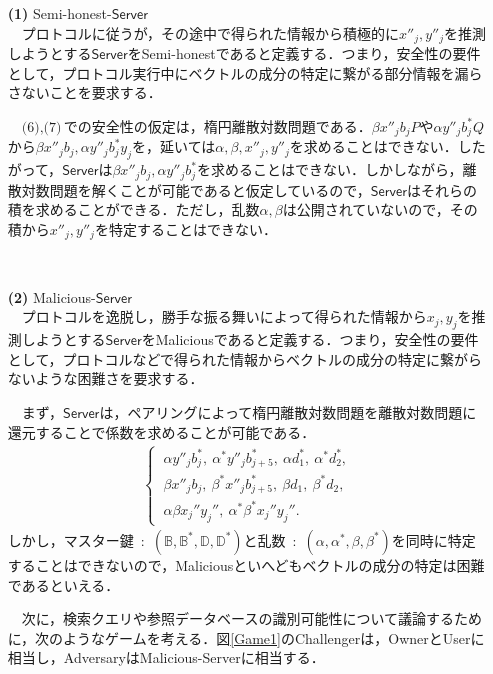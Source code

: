 \documentclass[a4paper]{jsarticle}
\newcommand{\user}{\textsf{User}}
\newcommand{\server}{\textsf{Server}}
\newcommand{\owner}{\textsf{Owner}}
\begin{document}
\begin{enumerate}
\item[\textbf{(1)}] Semi-honest-$\mathsf{Server}$\\
　プロトコルに従うが，その途中で得られた情報から積極的に$x''_j,y''_j$を推測しようとする$\mathsf{Server}$をSemi-honestであると定義する．つまり，安全性の要件として，プロトコル実行中にベクトルの成分の特定に繋がる部分情報を漏らさないことを要求する．

　$\textit{(6)},\textit{(7)}$での安全性の仮定は，楕円離散対数問題である．$\beta x''_j b_j P$や$\alpha y''_j b_j^* Q$から$\beta x''_j b_j, \alpha y''_j b_j^* y_j$を，延いては$\alpha, \beta, x''_j, y''_j$を求めることはできない．したがって，$\mathsf{Server}$は$\beta x''_j b_j, \alpha y''_j b_j^*$を求めることはできない．しかしながら，離散対数問題を解くことが可能であると仮定しているので，$\mathsf{Server}$はそれらの積を求めることができる．ただし，乱数$\alpha, \beta$は公開されていないので，その積から$x''_j, y''_j$を特定することはできない．

\ \ \ \ 

\item[\textbf{(2)}] Malicious-$\mathsf{Server}$\\
　プロトコルを逸脱し，勝手な振る舞いによって得られた情報から$x_j,y_j$を推測しようとする$\mathsf{Server}$をMaliciousであると定義する．つまり，安全性の要件として，プロトコルなどで得られた情報からベクトルの成分の特定に繋がらないような困難さを要求する．

　まず，$\mathsf{Server}$は，ペアリングによって楕円離散対数問題を離散対数問題に還元することで係数を求めることが可能である．
\begin{align}
\begin{cases}
\ \alpha y''_jb_j^*,\ \alpha^* y''_j b^*_{j+5},\ \alpha d_1^*,\ \alpha^* d_2^*,\\
\ \beta x''_jb_j,\ \beta^* x''_j b^*_{j+5},\ \beta d_1,\ \beta^* d_2,\\
\ \alpha\beta x_j'' y_j'',\ \alpha^*\beta^* x_j'' y_j''.
\end{cases}
\end{align}
しかし，マスター鍵\ :\ $(\mathbb{B},\mathbb{B}^*,\mathbb{D},\mathbb{D}^*)$と乱数\ :\ $(\alpha,\alpha^*,\beta,\beta^*)$を同時に特定することはできないので，Maliciousといへどもベクトルの成分の特定は困難であるといえる．

　次に，検索クエリや参照データベースの識別可能性について議論するために，次のようなゲームを考える．図\ref{Game1}の\textsf{Challenger}は，\owner と\user に相当し，\textsf{Adversary}はMalicious-\server に相当する．


\end{enumerate}
\end{document}

